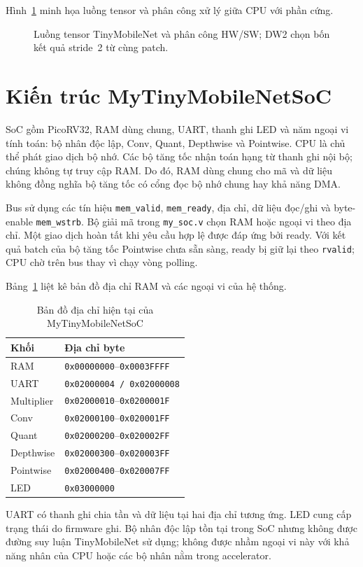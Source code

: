 Hình~\ref{fig:network-placeholder} minh họa luồng tensor và phân công xử lý giữa CPU với phần cứng.

\begin{figure}[!ht]
\captionsetup{aboveskip=6pt,belowskip=0pt}
\centering
\resizebox{0.93\textwidth}{!}{}
\caption{Luồng tensor TinyMobileNet và phân công HW/SW; DW2 chọn bốn kết quả stride~2 từ cùng patch.}
\label{fig:network-placeholder}
\end{figure}

\section{Kiến trúc MyTinyMobileNetSoC}
SoC gồm PicoRV32, RAM dùng chung, UART, thanh ghi LED và năm ngoại vi tính toán: bộ nhân độc lập, Conv, Quant, Depthwise và Pointwise. CPU là chủ thể phát giao dịch bộ nhớ. Các bộ tăng tốc nhận toán hạng từ thanh ghi nội bộ; chúng không tự truy cập RAM. Do đó, RAM dùng chung cho mã và dữ liệu không đồng nghĩa bộ tăng tốc có cổng đọc bộ nhớ chung hay khả năng DMA.

Bus sử dụng các tín hiệu \texttt{mem\_valid}, \texttt{mem\_ready}, địa chỉ, dữ liệu đọc/ghi và byte-enable \texttt{mem\_wstrb}. Bộ giải mã trong \texttt{my\_soc.v} chọn RAM hoặc ngoại vi theo địa chỉ. Một giao dịch hoàn tất khi yêu cầu hợp lệ được đáp ứng bởi ready. Với kết quả batch của bộ tăng tốc Pointwise chưa sẵn sàng, ready bị giữ lại theo \texttt{rvalid}; CPU chờ trên bus thay vì chạy vòng polling.

Bảng~\ref{tab:mmio-current} liệt kê bản đồ địa chỉ RAM và các ngoại vi của hệ thống.

\begin{table}[!ht]
\renewcommand{\arraystretch}{1.12}
\centering
\caption{Bản đồ địa chỉ hiện tại của MyTinyMobileNetSoC}
\label{tab:mmio-current}
\begin{tabular}{ll}
\hline
Khối & Địa chỉ byte \\
\hline
RAM & \texttt{0x00000000}--\texttt{0x0003FFFF} \\
UART & \texttt{0x02000004 / 0x02000008} \\
Multiplier & \texttt{0x02000010}--\texttt{0x0200001F} \\
Conv & \texttt{0x02000100}--\texttt{0x020001FF} \\
Quant & \texttt{0x02000200}--\texttt{0x020002FF} \\
Depthwise & \texttt{0x02000300}--\texttt{0x020003FF} \\
Pointwise & \texttt{0x02000400}--\texttt{0x020007FF} \\
LED & \texttt{0x03000000} \\
\hline
\end{tabular}
\end{table}
UART có thanh ghi chia tần và dữ liệu tại hai địa chỉ tương ứng. LED cung cấp trạng thái do firmware ghi. Bộ nhân độc lập tồn tại trong SoC nhưng không được đường suy luận TinyMobileNet sử dụng; không được nhầm ngoại vi này với khả năng nhân của CPU hoặc các bộ nhân nằm trong accelerator.

